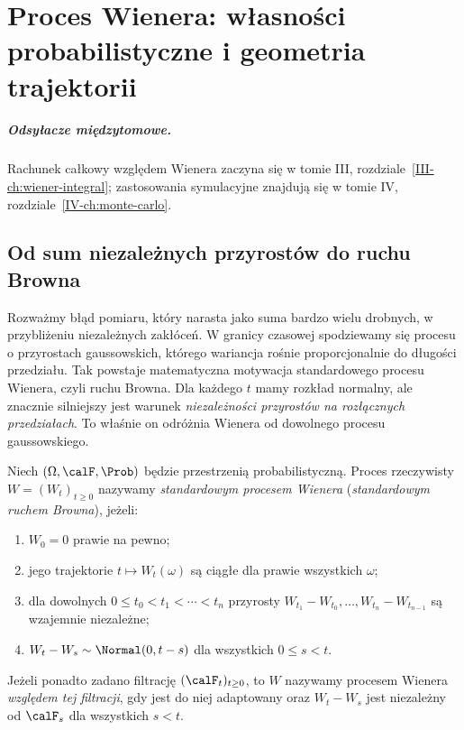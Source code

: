 \chapter{Proces Wienera: własności probabilistyczne i geometria trajektorii}
\label{ch:wiener}
\paragraph{Odsyłacze międzytomowe.} Rachunek całkowy względem Wienera zaczyna się w tomie III, rozdziale~\ref{III-ch:wiener-integral}; zastosowania symulacyjne znajdują się w tomie IV, rozdziale~\ref{IV-ch:monte-carlo}.


\section{Od sum niezależnych przyrostów do ruchu Browna}
Rozważmy błąd pomiaru, który narasta jako suma bardzo wielu drobnych,
w przybliżeniu niezależnych zakłóceń. W granicy czasowej spodziewamy
się procesu o przyrostach gaussowskich, którego wariancja rośnie
proporcjonalnie do długości przedziału. Tak powstaje matematyczna
motywacja standardowego procesu Wienera, czyli ruchu Browna.
Dla każdego $t$ mamy rozkład normalny, ale znacznie silniejszy
jest warunek \emph{niezależności przyrostów na rozłącznych
przedziałach}. To właśnie on odróżnia Wienera od dowolnego
procesu gaussowskiego.

\begin{definicja}
Niech $(\Omega,\calF,\Prob)$ będzie przestrzenią probabilistyczną.
Proces rzeczywisty $W=(W_t)_{t\ge0}$ nazywamy
\emph{standardowym procesem Wienera} (\emph{standardowym ruchem Browna}),
jeżeli:
\begin{enumerate}
\item $W_0=0$ prawie na pewno;
\item jego trajektorie $t\mapsto W_t(\omega)$ są ciągłe dla prawie
wszystkich $\omega$;
\item dla dowolnych $0\le t_0<t_1<\cdots<t_n$ przyrosty
$W_{t_1}-W_{t_0},\ldots,W_{t_n}-W_{t_{n-1}}$
są wzajemnie niezależne;
\item $W_t-W_s\sim\Normal(0,t-s)$ dla wszystkich $0\le s<t$.
\end{enumerate}
Jeżeli ponadto zadano filtrację $(\calF_t)_{t\ge0}$, to $W$
nazywamy procesem Wienera \emph{względem tej filtracji},
gdy jest do niej adaptowany oraz $W_t-W_s$ jest niezależny
od $\calF_s$ dla wszystkich $s<t$.
\end{definicja}

